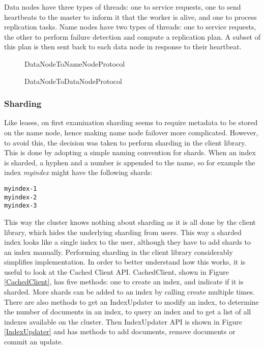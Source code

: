 \documentclass[a4paper,10pt]{article}
\begin{document}
Data nodes have three types of threads: one to service requests, one to send heartbeats to the master to inform it that the worker is alive, and one to process replication tasks. Name nodes have two types of threads: one to service requests, the other to perform failure detection and compute a replication plan. A subset of this plan is then sent back to each data node in response to their heartbeat.

\begin{figure}

\caption{DataNodeToNameNodeProtocol}
\label{DataNodeToNameNodeProtocol}
\end{figure}

\begin{figure}

\caption{DataNodeToDataNodeProtocol}
\label{DataNodeToDataNodeProtocol}
\end{figure}

\subsubsection{Sharding}
Like leases, on first examination sharding seems to require metadata to be stored on the name node, hence making name node failover more complicated. However, to avoid this, the decision was taken to perform sharding in the client library. This is done by adopting a simple naming convention for shards. When an index is sharded, a hyphen and a number is appended to the name, so for example the index \emph{myindex} might have the following shards:

\begin{verbatim}
myindex-1
myindex-2
myindex-3
\end{verbatim}

This way the cluster knows nothing about sharding as it is all done by the client library, which hides the underlying sharding from users. This way a sharded index looks like a single index to the user, although they have to add shards to an index manually. Performing sharding in the client library considerably simplifies implementation. In order to better understand how this works, it is useful to look at the Cached Client API. CachedClient, shown in Figure \ref{CachedClient}, has five methods: one to create an index, and indicate if it is sharded. More shards can be added to an index by calling create multiple times. There are also methods to get an IndexUpdater to modify an index, to determine the number of documents in an index, to query an index and to get a list of all indexes available on the cluster. Then IndexUpdater API is shown in Figure \ref{IndexUpdater} and has methods to add documents, remove documents or commit an update. 
\end{document}
